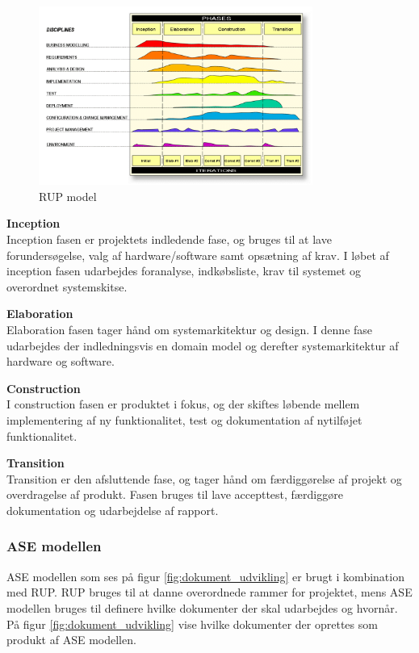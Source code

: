 \begin{figure}[H]
	\centering
	\includegraphics[width=0.80\textwidth]{Billeder/Udviklingsproces/RUP}
	\caption{RUP model}
	\label{fig:rup}
\end{figure}

\textbf{Inception}\\
Inception fasen er projektets indledende fase, og bruges til at lave forundersøgelse, valg af hardware/software samt opsætning af krav. I løbet af inception fasen udarbejdes foranalyse, indkøbsliste, krav til systemet og overordnet systemskitse. 

\textbf{Elaboration}\\
Elaboration fasen tager hånd om systemarkitektur og design. I denne fase udarbejdes der indledningsvis en domain model og derefter systemarkitektur af hardware og software. 

\textbf{Construction}\\
I construction fasen er produktet i fokus, og der skiftes løbende mellem implementering af ny funktionalitet, test og dokumentation af nytilføjet funktionalitet. 

\textbf{Transition}\\
Transition er den afsluttende fase, og tager hånd om færdiggørelse af projekt og overdragelse af produkt. Fasen bruges til lave accepttest, færdiggøre dokumentation og udarbejdelse af rapport. 

\newpage

\subsubsection*{ASE modellen}
ASE modellen som ses på figur \ref{fig:dokument_udvikling} er brugt i kombination med RUP. RUP bruges til at danne overordnede rammer for projektet, mens ASE modellen bruges til definere hvilke dokumenter der skal udarbejdes og hvornår. På figur \ref{fig:dokument_udvikling} vise hvilke dokumenter der oprettes som produkt af ASE modellen. 

